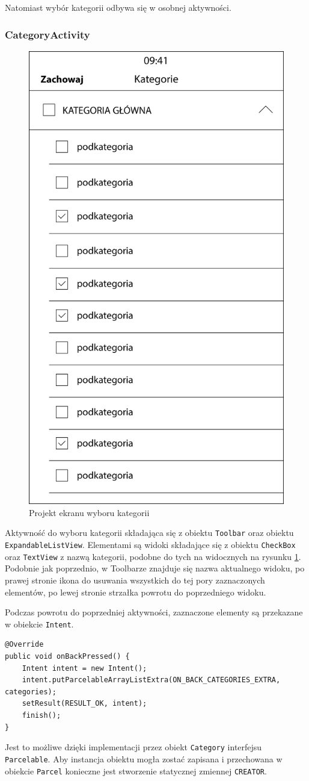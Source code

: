 \documentclass[twoside]{projektInzynierskiMS}
\begin{document}
Natomiast wybór kategorii odbywa się w osobnej aktywności.

\subsubsection{CategoryActivity}

\begin{figure}[h]
  \centering
  \includegraphics[width=0.4\linewidth]{img/CategoriesProject.png}
  \caption{Projekt ekranu wyboru kategorii}
  \label{fig:androidCategories}
\end{figure}

Aktywność do wyboru kategorii składająca się z obiektu \verb`Toolbar` oraz obiektu \verb`ExpandableListView`. Elementami są widoki składające się z obiektu \verb`CheckBox` oraz \verb`TextView` z nazwą kategorii, podobne do tych na widocznych na rysunku \ref{fig:androidCategories}. Podobnie jak poprzednio, w Toolbarze znajduje się nazwa aktualnego widoku, po prawej stronie ikona do usuwania wszystkich do tej pory zaznaczonych elementów, po lewej stronie strzałka powrotu do poprzedniego widoku. 

Podczas powrotu do poprzedniej aktywności, zaznaczone elementy są przekazane w obiekcie \verb`Intent`. 

\begin{verbatim}
@Override
public void onBackPressed() {
    Intent intent = new Intent();
    intent.putParcelableArrayListExtra(ON_BACK_CATEGORIES_EXTRA, categories);
    setResult(RESULT_OK, intent);
    finish();
}
\end{verbatim} 

Jest to możliwe dzięki implementacji przez obiekt \verb`Category` interfejsu \verb`Parcelable`. Aby instancja obiektu mogła zostać zapisana i przechowana w obiekcie \verb`Parcel` konieczne jest stworzenie statycznej zmiennej \verb`CREATOR`.
\end{document}
